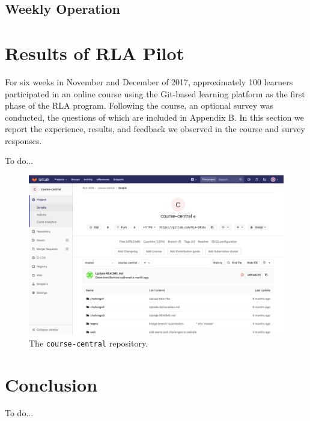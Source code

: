 \documentclass[12pt,twoside,vi]{mitthesis}
\newcommand{\wip}[1]{{\color{red} To do...}}
\begin{document}
\section{Weekly Operation}

\chapter{Results of RLA Pilot}

For six weeks in November and December of 2017, approximately 100 learners participated in an online course using the Git-based learning platform as the first phase of the RLA program. Following the course, an optional survey was conducted, the questions of which are included in Appendix B. In this section we report the experience, results, and feedback we observed in the course and survey responses.

\wip{Frame around tensions, for each broad set of interactions go over "what did it look like", "how did it work", and "how well did it work"}

\begin{figure}[H]
\centering
\includegraphics[scale=0.3]{fig-course-central.png}
\caption{The \texttt{course-central} repository.}
\end{figure}

\chapter{Conclusion}

\wip{narrative summary of thesis, an honest set of personal takeaways (from which reader can judge whether to replicate work) and feeligns about future work}

\appendix
\end{document}
